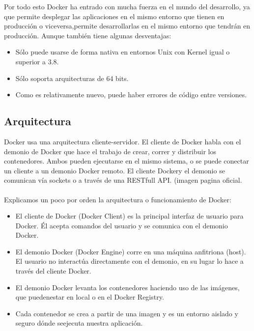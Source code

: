 \documentclass[preprint,12pt]{elsarticle}
\begin{document}
Por todo esto Docker ha entrado con mucha fuerza en el mundo del desarrollo, ya que permite desplegar las aplicaciones en el mismo entorno que tienen en producción o viceversa,permite desarrollarlas en el mismo entorno que tendrán en producción. Aunque también tiene algunas desventajas:

\begin{itemize}
\item Sólo puede usarse de forma nativa en entornos Unix con Kernel igual o superior a 3.8.
\item Sólo soporta arquitecturas de 64 bits.
\item Como es relativamente nuevo, puede haber errores de código entre versiones.

\end{itemize}

\subsection{\textbf{Arquitectura}}
Docker usa una arquitectura cliente-servidor. El cliente de Docker habla con el demonio de Docker que hace el trabajo de crear, correr y distribuir los contenedores. Ambos pueden ejecutarse en el mismo sistema, o se puede conectar un cliente a un demonio Docker remoto. El cliente Dockery el demonio se comunican vía sockets o a través de una RESTfull API. (imagen pagina oficial. \\ \\Explicamos un poco por orden la arquitectura o funcionamiento de Docker: 
\begin{itemize}
\item El cliente de Docker (Docker Client) es la principal interfaz de usuario para Docker. Él acepta comandos del usuario y se comunica con el demonio Docker.
\item El demonio Docker (Docker Engine) corre en una máquina anfitriona (host). El usuario no interactúa directamente con el demonio, en su lugar lo hace a través del cliente Docker.
\item El demonio Docker levanta los contenedores haciendo uso de las imágenes, que puedenestar en local o en el Docker Registry. 
\item Cada contenedor se crea a partir de una imagen y es un entorno aislado y seguro dónde seejecuta nuestra aplicación.
\end{itemize}
\end{document}
